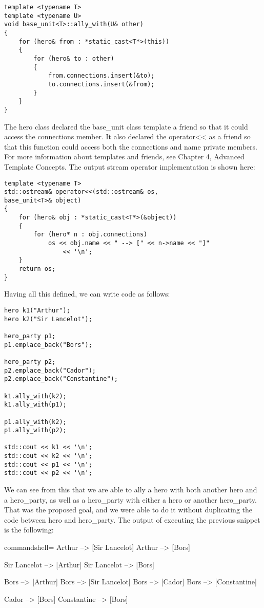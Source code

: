 \begin{lstlisting}[style=styleCXX]
template <typename T>
template <typename U>
void base_unit<T>::ally_with(U& other)
{
	for (hero& from : *static_cast<T*>(this))
	{
		for (hero& to : other)
		{
			from.connections.insert(&to);
			to.connections.insert(&from);
		}
	}
}
\end{lstlisting}

The hero class declared the base\_unit class template a friend so that it could access the connections member. It also declared the operator<{}< as a friend so that this function could access both the connections and name private members. For more information about templates and friends, see Chapter 4, Advanced Template Concepts. The output stream operator implementation is shown here:

\begin{lstlisting}[style=styleCXX]
template <typename T>
std::ostream& operator<<(std::ostream& os,
base_unit<T>& object)
{
	for (hero& obj : *static_cast<T*>(&object))
	{
		for (hero* n : obj.connections)
			os << obj.name << " --> [" << n->name << "]"
				<< '\n';
	}
	return os;
}
\end{lstlisting}

Having all this defined, we can write code as follows:

\begin{lstlisting}[style=styleCXX]
hero k1("Arthur");
hero k2("Sir Lancelot");

hero_party p1;
p1.emplace_back("Bors");

hero_party p2;
p2.emplace_back("Cador");
p2.emplace_back("Constantine");

k1.ally_with(k2);
k1.ally_with(p1);

p1.ally_with(k2);
p1.ally_with(p2);

std::cout << k1 << '\n';
std::cout << k2 << '\n';
std::cout << p1 << '\n';
std::cout << p2 << '\n';
\end{lstlisting}

We can see from this that we are able to ally a hero with both another hero and a hero\_party, as well as a hero\_party with either a hero or another hero\_party. That was the proposed goal, and we were able to do it without duplicating the code between hero and hero\_party. The output of executing the previous snippet is the following:

\begin{tcblisting}{commandshell={}}
Arthur --> [Sir Lancelot]
Arthur --> [Bors]

Sir Lancelot --> [Arthur]
Sir Lancelot --> [Bors]

Bors --> [Arthur]
Bors --> [Sir Lancelot]
Bors --> [Cador]
Bors --> [Constantine]

Cador --> [Bors]
Constantine --> [Bors]
\end{tcblisting}

